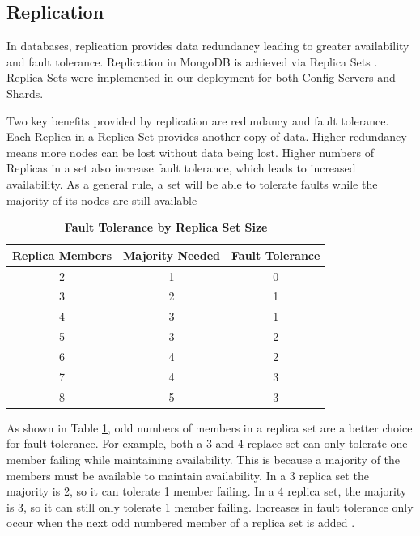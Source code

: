 \documentclass[9pt,twocolumn,twoside]{../../styles/osajnl}
\begin{document}
\subsection{Replication}

In databases, replication provides data redundancy leading to greater
availability and fault tolerance. Replication in MongoDB is achieved
via Replica Sets \cite{www-replication}. Replica Sets were implemented
in our deployment for both Config Servers and Shards.

Two key benefits provided by replication are redundancy and fault
tolerance. Each Replica in a Replica Set provides another copy of
data. Higher redundancy means more nodes can be lost without data
being lost. Higher numbers of Replicas in a set also increase fault
tolerance, which leads to increased availability. As a general rule, a
set will be able to tolerate faults while the majority of its nodes
are still available


\begin{table}[htbp]
\centering
\caption{\bf Fault Tolerance by Replica Set Size \cite{www-mongoRepDep}}

 \begin{tabular}{|c | c | c|} 
 \hline
Replica Members &  Majority Needed & Fault Tolerance \\ [0.5ex] 
 \hline\hline
    
2 &	1 &	0 \\
 \hline
3 &	2 &	1 \\ 
 \hline
4 &	3 &	1 \\ 
 \hline
5 &	3 &	2 \\ 
 \hline
6 &	4 &	2\\ 
 \hline
7 &	4 &	3\\ 
 \hline
8 &	5 &	3\\ [1ex] 
 \hline

\end{tabular}
  \label{tab:fault-tolerance}
\end{table}


As shown in Table \ref{tab:fault-tolerance}, odd numbers of members in
a replica set are a better choice for fault tolerance. For example,
both a 3 and 4 replace set can only tolerate one member failing while
maintaining availability. This is because a majority of the members
must be available to maintain availability. In a 3 replica set the
majority is 2, so it can tolerate 1 member failing. In a 4 replica
set, the majority is 3, so it can still only tolerate 1 member
failing. Increases in fault tolerance only occur when the next odd
numbered member of a replica set is added \cite{www-mongoRepDep}.
\end{document}

